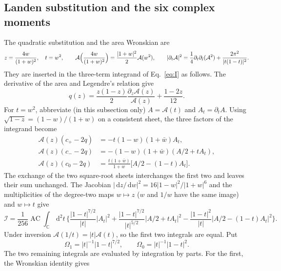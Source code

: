 \documentclass[11pt,a4paper]{article}
\numberwithin{equation}{section}
\newcommand{\dd}{\,\mathrm d}
\newcommand{\AC}{\operatorname{AC}}
\newcommand{\cI}{\mathcal I}
\begin{document}
\subsection{Landen substitution and the six complex moments}\label{app:cform:landen}
The quadratic substitution and the area Wronskian are
\begin{equation}
 z=\frac{4w}{(1+w)^2},\quad t=w^2,\qquad
 \mathcal A\Bigl(\frac{4w}{(1+w)^2}\Bigr)=\frac{|1+w|^2}{2}\mathcal A(w^2),\qquad
 |\partial_t\mathcal A|^2=\frac14\partial_t\partial_{\bar t}(\mathcal A^2)+\frac{2\pi^2}{|t(1-t)|^2}.
 \label{eq:cform:landen}
\end{equation}
They are inserted in the three-term integrand of Eq.~\eqref{eq:I} as follows. The derivative of the area and
Legendre's relation give
\begin{equation}
 q(z)=\frac{z(1-z)}{2}\frac{\partial_z\mathcal A(z)}{\mathcal A(z)}+\frac{1-2z}{12}.
\end{equation}
For $t=w^2$, abbreviate (in this subsection only) $A=\mathcal A(t)$ and $A_t=\partial_tA$. Using
$\sqrt{1-z}=(1-w)/(1+w)$ on a consistent sheet, the three factors of the integrand become
\begin{equation}
\begin{aligned}
 \mathcal A(z)(c_+-2q)&=-t(1-w)(1+\bar w)A_t,\\
 \mathcal A(z)(c_--2q)&=-(1-w)(1+\bar w)(A/2+tA_t),\\
 \mathcal A(z)(c_0-2q)&=\frac{t(1+\bar w)}{1+w}\bigl[A/2-(1-t)A_t\bigr].
\end{aligned}
\end{equation}
The exchange of the two square-root sheets interchanges the first two and leaves their sum unchanged. The Jacobian
$|\dd z/\dd w|^2=16|1-w|^2/|1+w|^6$ and the multiplicities of the degree-two maps $w\mapsto z$ ($w$ and $1/w$ have the
same image) and $w\mapsto t$ give
\begin{equation}
 \cI=\frac1{256}\AC\!\int_{\mathbb C}\dd^2t\,\biggl\{\frac{|1-t|^{7/2}}{|t|}|A_t|^2
 +\frac{|1-t|^{7/2}}{|t|^{5/2}}|A/2+tA_t|^2-\frac{|1-t|^2}{|t|}|A/2-(1-t)A_t|^2\biggr\}.
 \label{eq:cform:landenI}
\end{equation}
Under inversion $\mathcal A(1/t)=|t|\mathcal A(t)$, so the first two integrals are equal. Put
\begin{equation}
 \Omega_1=|t|^{-1}|1-t|^{7/2},\qquad\Omega_0=|t|^{-1}|1-t|^2.
\end{equation}
The two remaining integrals are evaluated by integration by parts. For the first, the Wronskian identity gives
\end{document}
